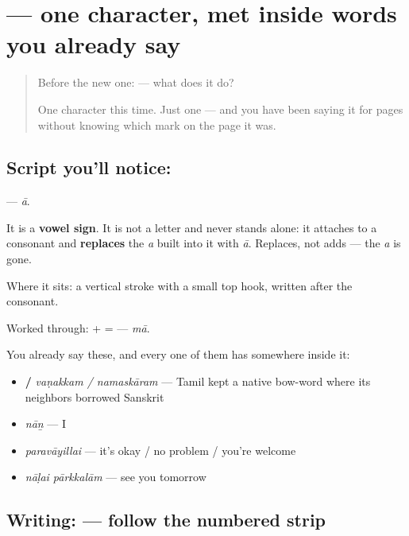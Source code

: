 \section[\texorpdfstring{\ta{ா} (ā)}{ா (ā)}]{ — one character, met inside words you already say}

\label{lesson:TA-S114-vowel-sign-aa}



\begin{quote}
Before the new one:  — what does it do?

One character this time. Just one — and you have been saying it for pages without knowing which mark on the page it was.
\end{quote}

\subsection*{Script you'll notice: }
\textbf{} — \emph{ā}.

It is a \textbf{vowel sign}. It is not a letter and never stands alone: it attaches to a consonant and \textbf{replaces} the \emph{a} built into it with \emph{ā}. Replaces, not adds — the \emph{a} is gone.

Where it sits: a vertical stroke with a small top hook, written after the consonant.

Worked through: \textbf{} + \textbf{} = \textbf{} — \emph{mā}.

You already say these, and every one of them has  somewhere inside it:

\begin{itemize}
\raggedright
  \item \textbf{ / } \emph{vaṇakkam / namaskāram} — Tamil kept a native bow-word where its neighbors borrowed Sanskrit
  \item \textbf{} \emph{nāṉ} — I
  \item \textbf{} \emph{paravāyillai} — it's okay / no problem / you're welcome
  \item \textbf{ } \emph{nāḷai pārkkalām} — see you tomorrow
\end{itemize}

\subsection*{Writing:  — follow the numbered strip}

